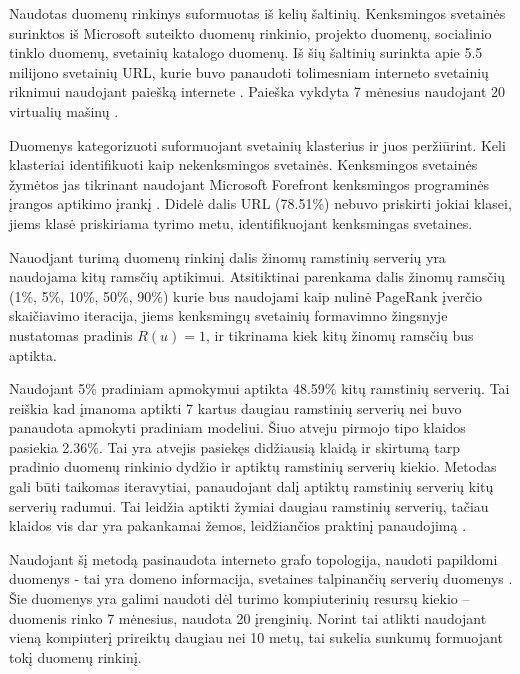 Naudotas duomenų rinkinys suformuotas iš kelių šaltinių. Kenksmingos svetainės surinktos iš Microsoft suteikto duomenų rinkinio,  projekto duomenų,  socialinio tinklo duomenų,  svetainių katalogo duomenų. Iš šių šaltinių surinkta apie 5.5 milijono svetainių URL, kurie buvo panaudoti tolimesniam interneto svetainių  riknimui naudojant paiešką internete \cite{linchpins}. Paieška vykdyta 7 mėnesius naudojant 20 virtualių mašinų \cite{linchpins}.

Duomenys kategorizuoti suformuojant svetainių klasterius ir juos peržiūrint. Keli klasteriai identifikuoti kaip nekenksmingos svetainės. Kenksmingos svetainės žymėtos jas tikrinant naudojant Microsoft Forefront kenksmingos programinės įrangos aptikimo įrankį \cite{linchpins}. Didelė dalis URL (78.51\%) nebuvo priskirti jokiai klasei, jiems klasė priskiriama tyrimo metu, identifikuojant kenksmingas svetaines.

Nauodjant turimą duomenų rinkinį dalis žinomų ramstinių serverių yra naudojama kitų ramsčių aptikimui. Atsitiktinai parenkama dalis žinomų ramsčių (1\%, 5\%, 10\%, 50\%, 90\%) kurie bus naudojami kaip nulinė PageRank įverčio skaičiavimo iteracija, jiems kenksmingų svetainių formavimno žingsnyje nustatomas pradinis $R(u) = 1$, ir tikrinama kiek kitų žinomų ramsčių bus aptikta.

Naudojant 5\% pradiniam apmokymui aptikta 48.59\% kitų ramstinių serverių. Tai reiškia kad įmanoma aptikti 7 kartus daugiau ramstinių serverių nei buvo panaudota apmokyti pradiniam modeliui. Šiuo atveju pirmojo tipo klaidos pasiekia 2.36\%. Tai yra atvejis pasiekęs didžiausią klaidą ir skirtumą tarp pradinio duomenų rinkinio dydžio ir aptiktų ramstinių serverių kiekio. Metodas gali būti taikomas iteravytiai, panaudojant dalį aptiktų ramstinių serverių kitų serverių radumui. Tai leidžia aptikti žymiai daugiau ramstinių serverių, tačiau klaidos vis dar yra pakankamai žemos, leidžiančios praktinį panaudojimą \cite{linchpins}.

Naudojant šį metodą pasinaudota interneto grafo topologija, naudoti papildomi duomenys - tai yra domeno informacija, svetaines talpinančių serverių duomenys \cite{linchpins}. Šie duomenys yra galimi naudoti dėl turimo kompiuterinių resursų kiekio -- duomenis rinko 7 mėnesius, naudota 20 įrenginių. Norint tai atlikti naudojant vieną kompiuterį prireiktų daugiau nei 10 metų, tai sukelia sunkumų formuojant tokį duomenų rinkinį.